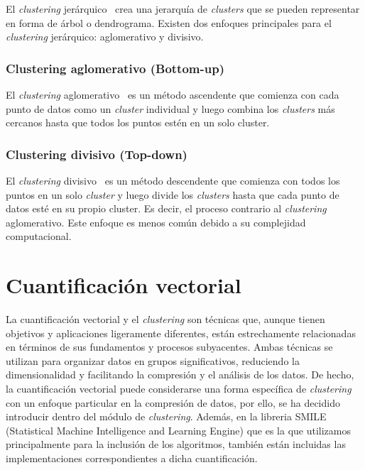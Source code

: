 El \emph{clustering} jerárquico~\cite{estrategia:jerarquico} crea una jerarquía de \emph{clusters} que se pueden representar en forma de árbol o dendrograma. Existen dos enfoques principales para el \emph{clustering} jerárquico: aglomerativo y divisivo.

\subsubsection{Clustering aglomerativo (Bottom-up)}
 
El \emph{clustering} aglomerativo~\cite{jerarquico:metodos} es un método ascendente que comienza con cada punto de datos como un \emph{cluster} individual y luego combina los \emph{clusters} más cercanos hasta que todos los puntos estén en un solo cluster.

\subsubsection{Clustering divisivo (Top-down)}

El \emph{clustering} divisivo~\cite{jerarquico:metodos} es un método descendente que comienza con todos los puntos en un solo \emph{cluster} y luego divide los \emph{clusters} hasta que cada punto de datos esté en su propio cluster. Es decir, el proceso contrario al \emph{clustering} aglomerativo. Este enfoque es menos común debido a su complejidad computacional.


\section{Cuantificación vectorial}

La cuantificación vectorial y el \emph{clustering} son técnicas que, aunque tienen objetivos y aplicaciones ligeramente diferentes, están estrechamente relacionadas en términos de sus fundamentos y procesos subyacentes. Ambas técnicas se utilizan para organizar datos en grupos significativos, reduciendo la dimensionalidad y facilitando la compresión y el análisis de los datos. De hecho, la cuantificación vectorial puede considerarse una forma específica de \emph{clustering} con un enfoque particular en la compresión de datos, por ello, se ha decidido introducir dentro del módulo de \emph{clustering}. Además, en la libreria SMILE~\cite{haifengl:VectorQuantization} (Statistical Machine Intelligence and Learning Engine) que es la que utilizamos principalmente para la inclusión de los algoritmos, también están incluidas las implementaciones correspondientes a dicha cuantificación.

